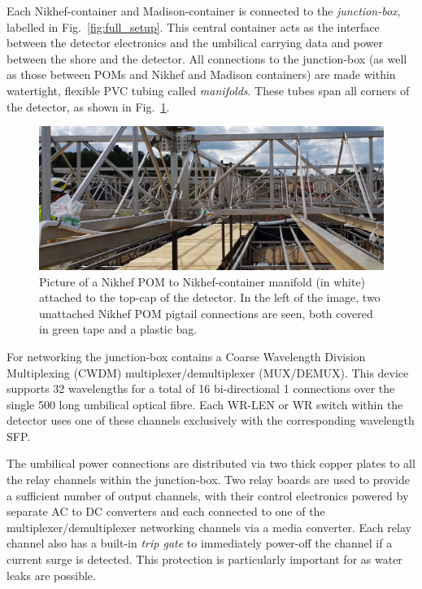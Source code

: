 Each Nikhef-container and Madison-container is connected to the \chipsfive \emph{junction-box},
labelled in Fig.~\ref{fig:full_setup}. This central container acts as the interface between the
detector electronics and the umbilical carrying data and power between the shore and the detector.
All connections to the junction-box (as well as those between POMs and Nikhef and Madison
containers) are made within watertight, flexible PVC tubing called \emph{manifolds}. These tubes
span all corners of the \chipsfive detector, as shown in Fig.~\ref{fig:manifold}.

\begin{figure} %
    \includegraphics[width=\textwidth]{diagrams/5-daq/manifold.pdf}
    \caption[manifold short]
    {Picture of a Nikhef POM to Nikhef-container manifold (in white) attached to the top-cap of
        the \chipsfive detector. In the left of the image, two unattached Nikhef POM pigtail
        connections are seen, both covered in green tape and a plastic bag.}
    \label{fig:manifold}
\end{figure}

For networking the junction-box contains a Coarse Wavelength Division Multiplexing (CWDM)
multiplexer/demultiplexer (MUX/DEMUX). This device supports 32 wavelengths for a total of 16
bi-directional \unit{1}{} connections over the single \unit{500}{} long
umbilical optical fibre. Each WR-LEN or WR switch within the detector uses one of these channels
exclusively with the corresponding wavelength SFP.

The umbilical power connections are distributed via two thick copper plates to all the relay
channels within the junction-box. Two relay boards are used to provide a sufficient number of
output channels, with their control electronics powered by separate AC to DC converters and each
connected to one of the multiplexer/demultiplexer networking channels via a media converter. Each
relay channel also has a built-in \emph{trip gate} to immediately power-off the channel if a
current surge is detected. This protection is particularly important for \chips as water leaks are
possible.


